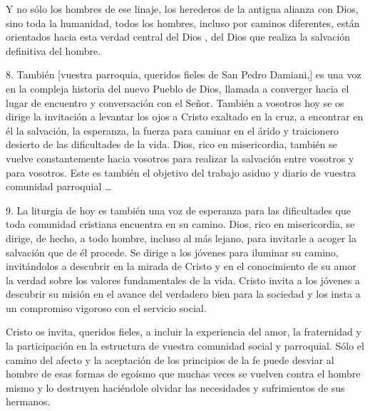 \begin{body}
Y no sólo los hombres de ese linaje, los herederos de la antigua alianza con Dios, sino toda la humanidad, todos los hombres, incluso por caminos diferentes, están orientados hacia esta verdad central del Dios , del Dios que realiza la salvación definitiva del hombre.

8. También [vuestra parroquia, queridos fieles de San Pedro Damiani,] es una voz en la compleja historia del nuevo Pueblo de Dios, llamada a converger hacia el lugar de encuentro y conversación con el Señor. También a vosotros hoy se os dirige la invitación a levantar los ojos a Cristo exaltado en la cruz, a encontrar en él la salvación, la esperanza, la fuerza para caminar en el árido y traicionero desierto de las dificultades de la vida. Dios, rico en misericordia, también se vuelve constantemente hacia vosotros para realizar la salvación entre vosotros y para vosotros. Este es también el objetivo del trabajo asiduo y diario de vuestra comunidad parroquial \ldots


9. La liturgia de hoy es también una voz de esperanza para las dificultades que toda comunidad cristiana encuentra en su camino. Dios, rico en misericordia, se dirige, de hecho, a todo hombre, incluso al más lejano, para invitarle a acoger la salvación que de él procede. Se dirige a los jóvenes para iluminar su camino, invitándolos a descubrir en la mirada de Cristo y en el conocimiento de su amor la verdad sobre los valores fundamentales de la vida. Cristo invita a los jóvenes a descubrir su misión en el avance del verdadero bien para la sociedad y los insta a un compromiso vigoroso con el servicio social.

Cristo os invita, queridos fieles, a incluir la experiencia del amor, la fraternidad y la participación en la estructura de vuestra comunidad social y parroquial. Sólo el camino del afecto y la aceptación de los principios de la fe puede desviar al hombre de esas formas de egoísmo que muchas veces se vuelven contra el hombre mismo y lo destruyen haciéndole olvidar las necesidades y sufrimientos de sus hermanos.


\end{body}
